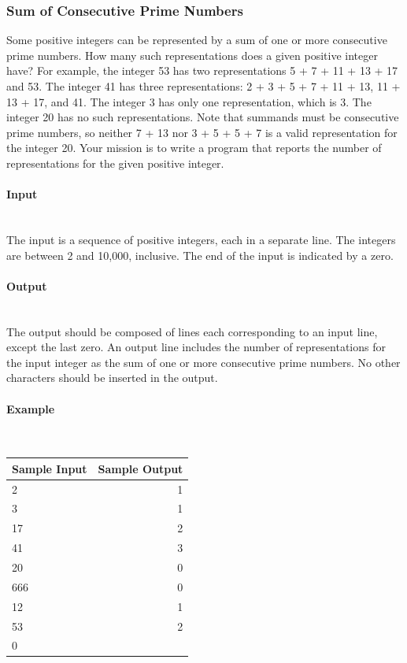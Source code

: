 \documentclass{article}
\begin{document}
\subsubsection{Sum of Consecutive Prime Numbers}

Some positive integers can be represented by a sum of one or more consecutive prime numbers.
How many such representations does a given positive integer have? For example, the integer 53
has two representations 5 + 7 + 11 + 13 + 17 and 53. The integer 41 has three representations:
2 + 3 + 5 + 7 + 11 + 13, 11 + 13 + 17, and 41. The integer 3 has only one representation, which is
3. The integer 20 has no such representations. Note that summands must be consecutive prime
numbers, so neither 7 + 13 nor 3 + 5 + 5 + 7 is a valid representation for the integer 20. Your
mission is to write a program that reports the number of representations for the given positive
integer.

\paragraph{Input} \mbox{} \\

The input is a sequence of positive integers, each in a separate line. The integers are between 2 and
10,000, inclusive. The end of the input is indicated by a zero.

\paragraph{Output}\mbox{} \\

The output should be composed of lines each corresponding to an input line, except the last zero.
An output line includes the number of representations for the input integer as the sum of one or
more consecutive prime numbers. No other characters should be inserted in the output.

\paragraph{Example}\mbox{} \\

\begin{table}[h]
    \centering
    \begin{tabular}{|l|r|}
        \hline
        \textbf{Sample Input} & \textbf{Sample Output} \\
        \hline
        2  &  1 \\ 
        3  &  1 \\ 
        17 &  2 \\ 
        41 &  3 \\
        20 & 0 \\
        666 & 0 \\
        12 & 1 \\ 
        53 & 2 \\
        0 & \\\hline
    \end{tabular}
\end{table}
\end{document}
